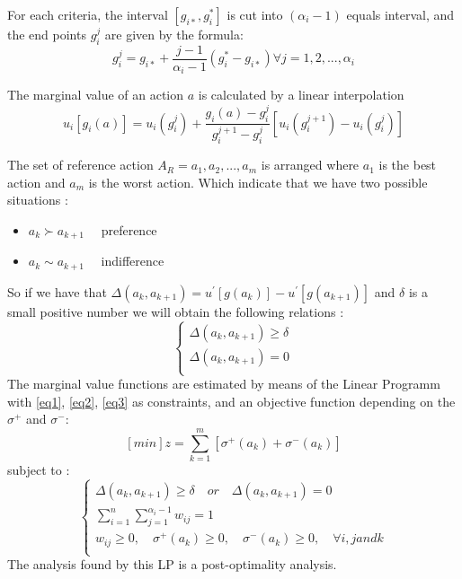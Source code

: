 \documentclass{report}
\begin{document}
\newpage
For each criteria, the interval $[g_{i*}, g_i^{*}]$ is cut into $(\alpha _i -1)$ equals interval, and the end points $g_i^{j}$ are given by the formula:
\begin{equation}
	g_i^{j}= g_{i*} + \frac{j-1}{\alpha _i -1} (g_i^{*} - g_{i*})  \forall j = 1,2, ..., \alpha _i
\end{equation}

The marginal value of an action $a$ is calculated by a linear interpolation
\begin{equation}
	u_i [g_i (a)] = u_i (g_i^{j}) + \frac{g_i (a) - g_i^{j}}{ g_i^{j+1} - g_i^{j}} [u_i (g_i^{j+1}) - u_i (g_i^{j}) ] 
\end{equation}

The set of reference action $ A_R = a_1, a_2, ... , a_m$ is arranged where $a_1$ is the best action and $a_m$ is the worst action. Which indicate that we have two possible situations  :
\begin{itemize}
\item $a_k  \succ a_{k+1} \quad $ preference 
\item $a_k \sim a_{k+1} \quad $ indifference
\end{itemize} 

So if we have that $\Delta (a_k, a_{k+1} ) = u^{'} [g(a_k)] - u^{'} [g(a_{k+1})]$ and $\delta$ is a small positive number we will obtain the following relations : 
\begin{equation}\label{eq3}
      \begin{cases}
      	\Delta (a_k, a_{k+1} ) \geq \delta\\
       	\Delta (a_k, a_{k+1} ) = 0 \\
      \end{cases}
\end{equation}
The marginal value functions are estimated by means of the Linear Programm with \eqref{eq1}, \eqref{eq2}, \eqref{eq3} as constraints, and an objective function depending on the $ \sigma^{+}$ and $\sigma^{-} $: 
$$ [min]z = \sum_{k=1}^{m} [ \sigma ^{+} (a_k) + \sigma ^{-} (a_k)]  $$
subject to : 
\begin{equation}\label{eq5}
      \begin{cases}
      	\Delta (a_k, a_{k+1} ) \geq \delta \quad or \quad \Delta (a_k, a_{k+1} ) = 0 \\
      	\sum_{i=1}^{n} \sum_{j=1}^{\alpha_i -1} w_{ij} = 1\\
       	w_{ij} \geq 0, \quad \sigma^{+}(a_k) \geq 0, \quad \sigma^{-}(a_k) \geq 0, \quad  \forall i, j  and  k\\
      \end{cases}
\end{equation}
The analysis found by this LP is a post-optimality analysis. 
\end{document}
